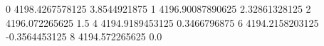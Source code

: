 0 4198.4267578125 3.8544921875
1 4196.90087890625 2.32861328125
2 4196.072265625 1.5
4 4194.9189453125 0.3466796875
6 4194.2158203125 -0.3564453125
8 4194.572265625 0.0
